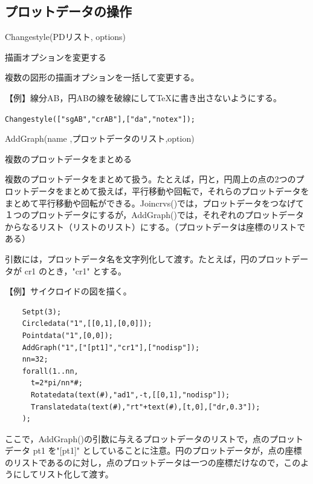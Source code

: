 \documentclass[papersize,a4paper,12pt,uplatex]{jsarticle}
\begin{document}
\subsection{プロットデータの操作}
\begin{description}

\hypertarget{changestyle}{}
\item[関数]  Changestyle(PDリスト, options)
\item[機能]  描画オプションを変更する
\item[説明]  複数の図形の描画オプションを一括して変更する。

\vspace{\baselineskip}
【例】線分AB，円ABの線を破線にして\TeX に書き出さないようにする。

\hspace{10mm} \verb|Changestyle(["sgAB","crAB"],["da","notex"]);|
    

\vspace{\baselineskip}
\hypertarget{addgraph}{}
\item[関数]  AddGraph(name ,プロットデータのリスト,option)
\item[機能]  複数のプロットデータをまとめる
\item[説明]  複数のプロットデータをまとめて扱う。たとえば，円と，円周上の点の2つのプロットデータをまとめて扱えば，平行移動や回転で，それらのプロットデータをまとめて平行移動や回転ができる。Joincrvs()では，プロットデータをつなげて１つのプロットデータにするが，AddGraph()では，それぞれのプロットデータからなるリスト（リストのリスト）にする。（プロットデータは座標のリストである）

引数には，プロットデータ名を文字列化して渡す。たとえば，円のプロットデータが cr1 のとき，"cr1" とする。

\vspace{\baselineskip}
【例】サイクロイドの図を描く。
\begin{verbatim}
    Setpt(3);
    Circledata("1",[[0,1],[0,0]]);
    Pointdata("1",[0,0]);
    AddGraph("1",["[pt1]","cr1"],["nodisp"]);
    nn=32;
    forall(1..nn,
      t=2*pi/nn*#;
      Rotatedata(text(#),"ad1",-t,[[0,1],"nodisp"]);
      Translatedata(text(#),"rt"+text(#),[t,0],["dr,0.3"]);
    );
\end{verbatim}

\vspace{\baselineskip}
\hspace{20mm}  

ここで，AddGraph()の引数に与えるプロットデータのリストで，点のプロットデータ pt1 を"[pt1]" としていることに注意。円のプロットデータが，点の座標のリストであるのに対し，点のプロットデータは一つの座標だけなので，このようにしてリスト化して渡す。


\end{description}
\end{document}
